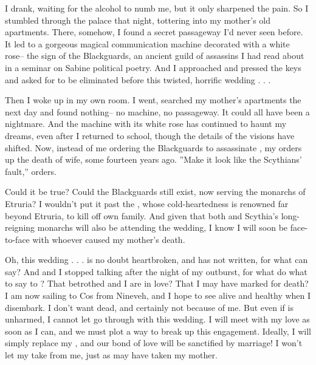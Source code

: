 \documentclass[char]{Kos}
\begin{document}
I drank, waiting for the alcohol to numb me, but it only sharpened the pain. So I stumbled through the palace that night, tottering into my mother's old apartments. There, somehow, I found a secret passageway I'd never seen before. It led to a gorgeous magical communication machine decorated with a white rose-- the sign of the Blackguards, an ancient guild of assassins I had read about in a seminar on Sabine political poetry. And I approached and pressed the keys and asked for \cGroom{} to be eliminated before this twisted, horrific wedding . . .

Then I woke up in my own room. I went, searched my mother's apartments the next day and found nothing-- no machine, no passageway. It could all have been a nightmare. And the machine with its white rose has continued to haunt my dreams, even after I returned to school, though the details of the visions have shifted. Now, instead of me ordering the Blackguards to assassinate \cGroom{}, my \cEtruriaKing{\parent} orders up the death of \cEtruriaKing{\their} wife, some fourteen years ago. ''Make it look like the Scythians' fault,'' \cEtruriaKing{\they} orders.

Could it be true? Could the Blackguards still exist, now serving the monarchs of Etruria? I wouldn't put it past the \cEtruriaKing{\monarch}, whose cold-heartedness is renowned far beyond Etruria, to kill off \cEtruriaKing{\their} own family. And given that both \cEtruriaKing{\they} and Scythia's long-reigning monarchs will also be attending the wedding, I know I will soon be face-to-face with whoever caused my mother's death.

Oh, this wedding . . . \cBride{} is no doubt heartbroken, and \cBride{\they} has not written, for what can \cBride{} say? And \cGroom{} and I stopped talking after the night of my outburst, for what do what to say to \cGroom{\them}? That \cGroom{\their} betrothed and I are in love? That I may have marked \cGroom{\them} for death? I am now sailing to Cos from Nineveh, and I hope to see \cGroom{\them} alive and healthy when I disembark. I don't want \cGroom{\them} dead, and certainly not because of me. But even if \cGroom{\they} is unharmed, I cannot let \cGroom{\them} go through with this wedding. I will meet with my love as soon as I can, and we must plot a way to break up this engagement. Ideally, I will simply replace my \cGroom{\sibling}, and our bond of love will be sanctified by marriage! I won't let my \cEtruriaKing{\parent} take \cBride{} from me, just as \cEtruriaKing{\they} may have taken my mother. 
\end{document}
